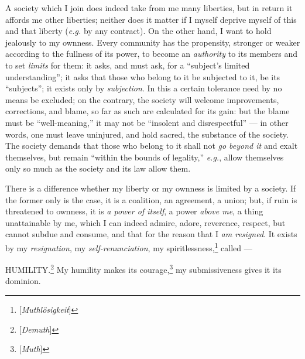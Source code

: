 A society which I join does indeed take from me many liberties, but in return 
it affords me other liberties; neither does it matter if I myself deprive 
myself of this and that liberty (\textit{e.g.} by any contract). On the other 
hand, I want to hold jealously to my ownness. Every community has the 
propensity, stronger or weaker according to the fullness of its power, to 
become an \textit{authority} to its members and to set \textit{limits} for 
them: it asks, and must ask, for a ``subject's limited understanding''; it 
asks that those who belong to it be subjected to it, be its ``subjects''; it 
exists only by \textit{subjection}. In this a certain tolerance need by no 
means be excluded; on the contrary, the society will welcome improvements, 
corrections, and blame, so far as such are calculated for its gain: but the 
blame must be ``well-meaning,'' it may not be ``insolent and 
disrespectful'' --- in other words, one must leave uninjured, and hold sacred, 
the substance of the society. The society demands that those who belong to it 
shall not \textit{go beyond it} and exalt themselves, but remain ``within the 
bounds of legality,'' \textit{e.g.}, allow themselves only so much as the 
society and its law allow them.

There is a difference whether my liberty or my ownness is limited by a 
society. If the former only is the case, it is a coalition, an agreement, a 
union; but, if ruin is threatened to ownness, it is \textit{a power of 
itself}, a power \textit{above me}, a thing unattainable by me, which I can 
indeed admire, adore, reverence, respect, but cannot subdue and consume, and 
that for the reason that I \textit{am resigned}. It exists by my 
\textit{resignation}, my \textit{self-renunciation}, my 
spiritlessness,\footnote{[\textit{Muthl\"osigkeit}]} called ---

HUMILITY.\footnote{[\textit{Demuth}]} My humility makes its 
courage,\footnote{[\textit{Muth}]} my submissiveness gives it its dominion.

